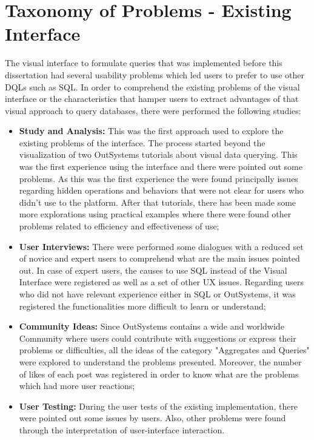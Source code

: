\chapter{Taxonomy of Problems - Existing Interface}
\label{app:taxonomy_of_problems_existing_interface}

The visual interface to formulate queries that was implemented before this dissertation had several usability problems which led users to prefer to use other \glspl{DQL} such as SQL. In order to comprehend the existing problems of the visual interface or the characteristics that hamper users to extract advantages of that visual approach to query databases, there were performed the following studies:

\begin{itemize}
    \item \textbf{Study and Analysis:} This was the first approach used to explore the existing problems of the interface. The process started beyond the visualization of two OutSystems tutorials \cite{outsystems_tutorial_aggregates_101, outsystems_tutorial_advanced_aggregates} about visual data querying. This was the first experience using the interface and there were pointed out some problems. As this was the first experience the were found principally issues regarding hidden operations and behaviors that were not clear for users who didn't use to the platform. After that tutorials, there has been made some more explorations using practical examples where there were found other problems related to efficiency and effectiveness of use;
    \item \textbf{User Interviews:} There were performed some dialogues with a reduced set of novice and expert users to comprehend what are the main issues pointed out. In case of expert users, the causes to use SQL instead of the Visual Interface were registered as well as a set of other \gls{UX} issues. Regarding users who did not have relevant experience either in SQL or OutSystems, it was registered the functionalities more difficult to learn or understand;
    \item \textbf{Community Ideas:} Since OutSystems contains a wide and worldwide Community where users could contribute with suggestions or express their problems or difficulties, all the ideas of the category "Aggregates and Queries" were explored to understand the problems presented. Moreover, the number of likes of each post was registered in order to know what are the problems which had more user reactions; 
    \item \textbf{User Testing:} During the user tests of the existing implementation, there were pointed out some issues by users. Also, other problems were found through the interpretation of user-interface interaction.
\end{itemize}

